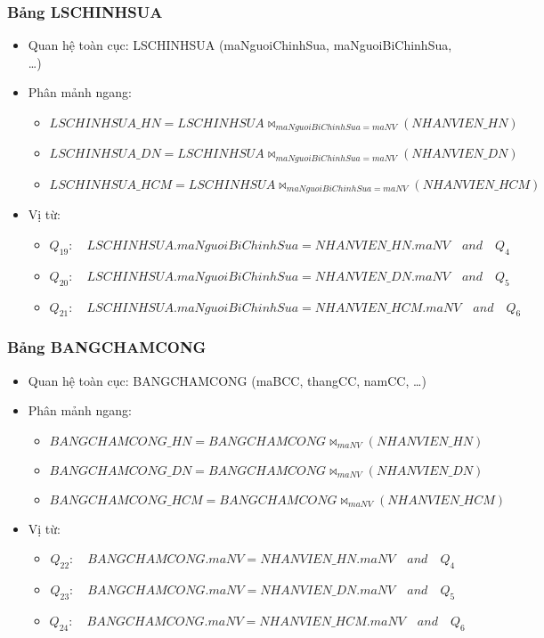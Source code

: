 \documentclass[a4paper,12pt]{report}
\begin{document}
\subsubsection{Bảng LSCHINHSUA}
\begin{itemize}
    \item Quan hệ toàn cục: LSCHINHSUA (maNguoiChinhSua, maNguoiBiChinhSua, \ldots)
    \item Phân mảnh ngang:
        \begin{itemize}[label=]
            \item \[LSCHINHSUA\_HN = LSCHINHSUA \bowtie_{maNguoiBiChinhSua=maNV}(NHANVIEN\_HN)\]
            \item \[LSCHINHSUA\_DN = LSCHINHSUA \bowtie_{maNguoiBiChinhSua=maNV}(NHANVIEN\_DN)\]
            \item \[LSCHINHSUA\_HCM = LSCHINHSUA \bowtie_{maNguoiBiChinhSua=maNV}(NHANVIEN\_HCM)\]
        \end{itemize}
    \item Vị từ:
    \begin{itemize}[label=]
        \item \[Q_{19}\colon\quad LSCHINHSUA.maNguoiBiChinhSua = NHANVIEN\_HN.maNV \quad and \quad Q_4\]
        \item \[Q_{20}\colon\quad LSCHINHSUA.maNguoiBiChinhSua = NHANVIEN\_DN.maNV \quad and \quad Q_5 \]
        \item \[Q_{21}\colon\quad LSCHINHSUA.maNguoiBiChinhSua = NHANVIEN\_HCM.maNV \quad and \quad Q_6\]
    \end{itemize}
\end{itemize}
\subsubsection{Bảng BANGCHAMCONG}
\begin{itemize}
    \item Quan hệ toàn cục: BANGCHAMCONG (maBCC, thangCC, namCC, \ldots)
    \item Phân mảnh ngang:
        \begin{itemize}[label=]
            \item \[BANGCHAMCONG\_HN = BANGCHAMCONG \bowtie_{maNV}(NHANVIEN\_HN)\]
            \item \[BANGCHAMCONG\_DN = BANGCHAMCONG \bowtie_{maNV}(NHANVIEN\_DN)\]
            \item \[BANGCHAMCONG\_HCM = BANGCHAMCONG \bowtie_{maNV}(NHANVIEN\_HCM)\]
        \end{itemize}
    \item Vị từ:
    \begin{itemize}[label=]
        \item \[Q_{22}\colon\quad BANGCHAMCONG.maNV = NHANVIEN\_HN.maNV \quad and \quad Q_4\]
        \item \[Q_{23}\colon\quad BANGCHAMCONG.maNV = NHANVIEN\_DN.maNV \quad and \quad Q_5 \]
        \item \[Q_{24}\colon\quad BANGCHAMCONG.maNV = NHANVIEN\_HCM.maNV \quad and \quad Q_6\]
    \end{itemize}
\end{itemize}
\end{document}
